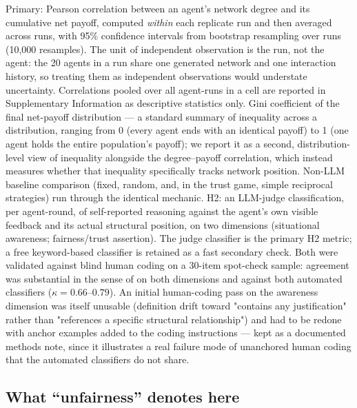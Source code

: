 \documentclass[11pt,a4paper]{article}
\begin{document}
Primary: Pearson correlation between an agent's network degree and its
cumulative net payoff, computed \emph{within} each replicate run and
then averaged across runs, with 95\% confidence intervals from
bootstrap resampling over runs (10,000 resamples). The unit of
independent observation is the run, not the agent: the 20 agents in a
run share one generated network and one interaction history, so
treating them as independent observations would understate
uncertainty. Correlations pooled over all agent-runs in a cell are
reported in Supplementary Information as descriptive statistics only. Gini coefficient of the final net-payoff
distribution --- a standard summary of inequality across a
distribution, ranging from 0 (every agent ends with an identical
payoff) to 1 (one agent holds the entire population's payoff);
we report it as a second, distribution-level view of inequality
alongside the degree--payoff correlation, which instead measures
whether that inequality specifically tracks network position.
Non-LLM baseline comparison (fixed, random, and, in the
trust game, simple reciprocal strategies) run through the identical
mechanic. H2: an LLM-judge classification, per agent-round, of
self-reported reasoning against the agent's own visible feedback and
its actual structural position, on two dimensions (situational
awareness; fairness/trust assertion). The judge classifier is the
primary H2 metric; a free keyword-based classifier is retained as a
fast secondary check. Both were validated against blind human coding
on a 30-item spot-check sample: agreement was substantial in the
sense of \citet{Landis:1977:Agreement} on both dimensions and against both
automated classifiers ($\kappa=0.66$--$0.79$). An initial human-coding pass on the awareness
dimension was itself unusable (definition drift toward "contains any
justification" rather than "references a specific structural
relationship") and had to be redone with anchor examples added to the
coding instructions --- kept as a documented methods note, since it
illustrates a real failure mode of unanchored human coding that the
automated classifiers do not share.

\subsection{What ``unfairness'' denotes here}
\end{document}
